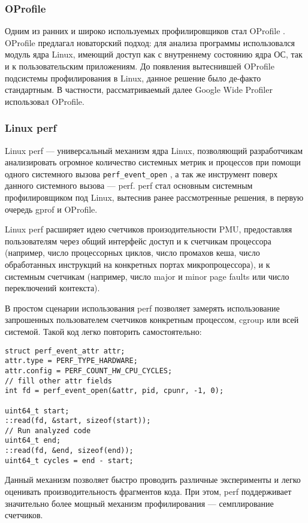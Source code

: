 \subsubsection{OProfile}
Одним из ранних и широко используемых профилировщиков стал OProfile \cite{oprofile}.
OProfile предлагал новаторский подход: для анализа программы использовался модуль ядра Linux, имеющий доступ как с внутреннему состоянию
ядра ОС, так и к пользовательским приложениям. До появления вытеснившей OProfile подсистемы профилирования в Linux, данное решение было
де-факто стандартным. В частности, рассматриваемый далее Google Wide Profiler \cite{gwp} использовал OProfile.

\subsubsection{Linux perf}
Linux perf \cite{perf} --- универсальный механизм ядра Linux, позволяющий разработчикам анализировать огромное количество системных метрик
и процессов при помощи одного системного вызова \verb!perf_event_open! \cite{perf:syscall},
а так же инструмент поверх данного системного вызова --- perf.
perf стал основным системным профилировщиком под Linux, вытеснив ранее рассмотренные решения, в первую очередь gprof и OProfile.

Linux perf расширяет идею счетчиков произодительности PMU, предоставляя пользователям через общий интерфейс доступ и к счетчикам
процессора (например, число процессорных циклов, число промахов кеша, число обработанных инструкций на конкретных портах микропроцессора),
и к системным счетчикам (например, число major и minor page faults или число переключений контекста).

В простом сценарии использования perf позволяет замерять использование запрошенных пользователем счетчиков конкретным процессом,
cgroup \cite{cgroup} или всей системой.
Такой код легко повторить самостоятельно:
\begin{verbatim}
struct perf_event_attr attr;
attr.type = PERF_TYPE_HARDWARE;
attr.config = PERF_COUNT_HW_CPU_CYCLES;
// fill other attr fields
int fd = perf_event_open(&attr, pid, cpunr, -1, 0);

uint64_t start;
::read(fd, &start, sizeof(start));
// Run analyzed code
uint64_t end;
::read(fd, &end, sizeof(end));
uint64_t cycles = end - start;
\end{verbatim}

Данный механизм позволяет быстро проводить различные эксперименты и легко оценивать производительность фрагментов кода.
При этом, perf поддерживает значительно более мощный механизм профилирования --- семплирование счетчиков.

